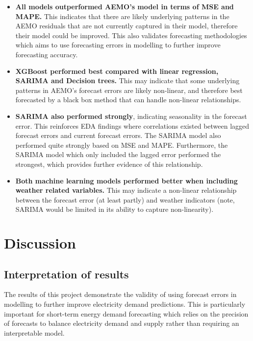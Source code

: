 \documentclass[mstat,12pt]{unswthesis}
\begin{document}
\begin{itemize}
\item
  \textbf{All models outperformed AEMO's model in terms of MSE and MAPE.} This indicates that there are likely underlying patterns in the AEMO residuals that are not currently captured in their model, therefore their model could be improved. This also validates forecasting methodologies which aims to use forecasting errors in modelling to further improve forecasting accuracy.
\item
  \textbf{XGBoost performed best compared with linear regression, SARIMA and Decision trees.} This may indicate that some underlying patterns in AEMO's forecast errors are likely non-linear, and therefore best forecasted by a black box method that can handle non-linear relationships.
\item
  \textbf{SARIMA also performed strongly}, indicating seasonality in the forecast error. This reinforces EDA findings where correlations existed between lagged forecast errors and current forecast errors. The SARIMA model also performed quite strongly based on MSE and MAPE. Furthermore, the SARIMA model which only included the lagged error performed the strongest, which provides further evidence of this relationship.
\item
  \textbf{Both machine learning models performed better when including weather related variables.} This may indicate a non-linear relationship between the forecast error (at least partly) and weather indicators (note, SARIMA would be limited in its ability to capture non-linearity).
\end{itemize}

\newpage

\chapter{Discussion}\label{discussion}

\section{Interpretation of results}\label{interpretation-of-results}

The results of this project demonstrate the validity of using forecast errors in modelling to further improve electricity demand predictions. This is particularly important for short-term energy demand forecasting which relies on the precision of forecasts to balance electricity demand and supply rather than requiring an interpretable model.
\end{document}
